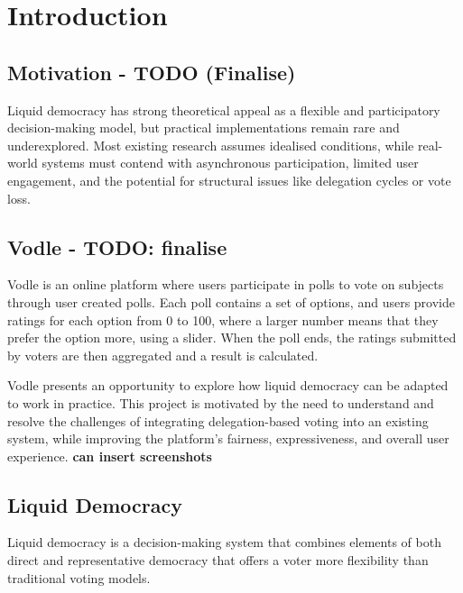 \chapter{Introduction}\label{ch:introduction}

\section{Motivation - TODO (Finalise)}
Liquid democracy has strong theoretical appeal as a flexible and participatory decision-making model, but practical implementations remain rare and underexplored. Most existing research assumes idealised conditions, while real-world systems must contend with asynchronous participation, limited user engagement, and the potential for structural issues like delegation cycles or vote loss.

\section{Vodle - TODO: finalise}
Vodle is an online platform where users participate in polls to vote on subjects through user created polls. Each poll contains a set of options, and users provide ratings for each option from 0 to 100, where a larger number means that they prefer the option more, using a slider. When the poll ends, the ratings submitted by voters are then aggregated and a result is calculated.

Vodle presents an opportunity to explore how liquid democracy can be adapted to work in practice. This project is motivated by the need to understand and resolve the challenges of integrating delegation-based voting into an existing system, while improving the platform's fairness, expressiveness, and overall user experience.
\textbf{can insert screenshots}

\section{Liquid Democracy}
Liquid democracy is a decision-making system that combines elements of both direct and representative democracy that offers a voter more flexibility than traditional voting models.

